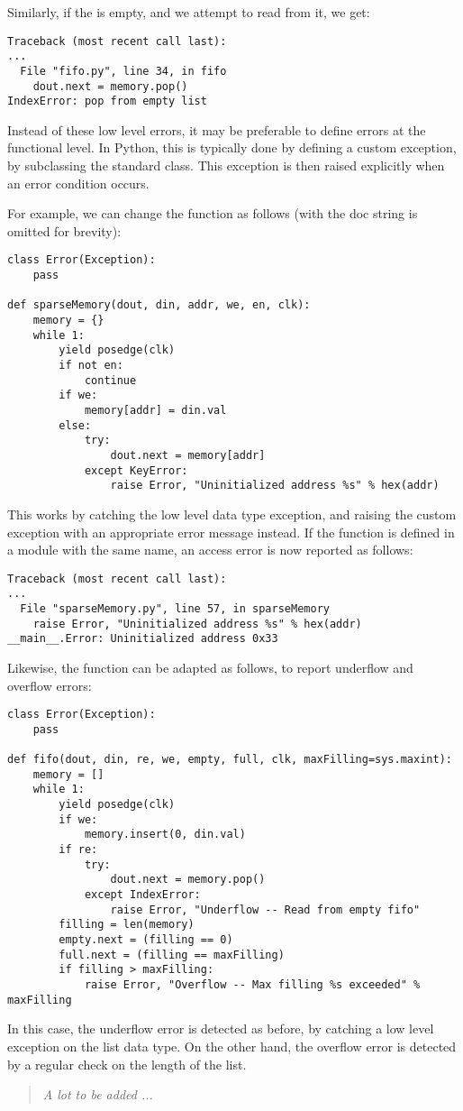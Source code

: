 Similarly, if the  is empty, and we attempt to read from
it, we get:

\begin{verbatim}
Traceback (most recent call last):
...
  File "fifo.py", line 34, in fifo
    dout.next = memory.pop()
IndexError: pop from empty list
\end{verbatim}

Instead of these low level errors, it may be preferable to define
errors at the functional level. In Python, this is typically done by
defining a custom  exception, by subclassing the standard
 class. This exception is then raised explicitly when
an error condition occurs.

For example, we can change the  function as
follows (with the doc string is omitted for brevity):

\begin{verbatim}
class Error(Exception):
    pass

def sparseMemory(dout, din, addr, we, en, clk):
    memory = {}
    while 1:
        yield posedge(clk)
        if not en:
            continue
        if we:
            memory[addr] = din.val
        else:
            try:
                dout.next = memory[addr]
            except KeyError:
                raise Error, "Uninitialized address %s" % hex(addr)
\end{verbatim}

This works by catching the low level data type exception, and raising
the custom exception with an appropriate error message instead.  If
the  function is defined in a module with the
same name, an access error is now reported as follows:

\begin{verbatim}
Traceback (most recent call last):
...
  File "sparseMemory.py", line 57, in sparseMemory
    raise Error, "Uninitialized address %s" % hex(addr)
__main__.Error: Uninitialized address 0x33
\end{verbatim}

Likewise, the  function can be adapted as follows, to
report underflow and overflow errors:

\begin{verbatim}
class Error(Exception):
    pass

def fifo(dout, din, re, we, empty, full, clk, maxFilling=sys.maxint):
    memory = []
    while 1:
        yield posedge(clk)
        if we:
            memory.insert(0, din.val)
        if re:
            try:
                dout.next = memory.pop()
            except IndexError:
                raise Error, "Underflow -- Read from empty fifo"
        filling = len(memory)
        empty.next = (filling == 0)
        full.next = (filling == maxFilling)
        if filling > maxFilling:
            raise Error, "Overflow -- Max filling %s exceeded" % maxFilling
\end{verbatim}

In this case, the underflow error is detected as before, by catching a
low level exception on the list data type. On the other hand, the
overflow error is detected by a regular check on the length of the
list.


\begin{quote}
\em
A lot to be added ...
\end{quote}
